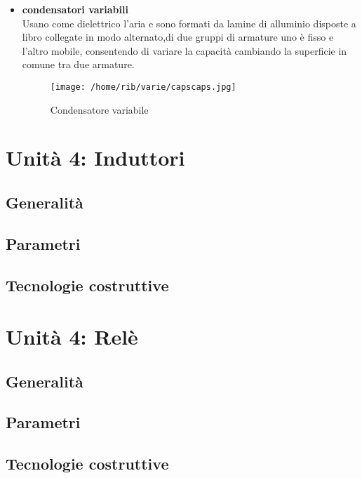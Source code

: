 \documentclass{article}
\begin{document}
\begin{itemize}
    \item \textbf{condensatori variabili}\\
    Usano come dielettrico l'aria e sono formati da lamine di alluminio disposte a libro collegate in modo alternato,di due gruppi di armature uno è fisso e l'altro mobile, consentendo di variare la capacità cambiando la superficie in comune tra due armature.
    \begin{figure}[H]
        \centering
        \texttt{[image: /home/rib/varie/capscaps.jpg]}
        \caption{Condensatore variabile}
        \label{varcap}
    \end{figure}
\end{itemize}
\section{Unità 4: Induttori}
\subsection{Generalità}
\subsection{Parametri}
\subsection{Tecnologie costruttive}

\section{Unità 4: Relè}
\subsection{Generalità}
\subsection{Parametri}
\subsection{Tecnologie costruttive}
\end{document}
